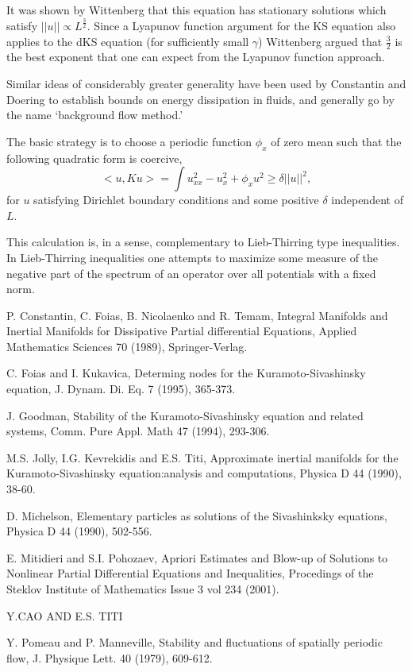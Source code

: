 It was shown by Wittenberg\cite{WITTENBERG} that this equation
has stationary solutions which satisfy $|\!|u|\!| \propto L^{\frac{3}{2}}.$
Since a Lyapunov function argument for the KS equation also applies
to the dKS equation (for sufficiently small $\gamma$) Wittenberg
argued that $\frac{3}{2}$ is the best exponent that one can expect
from the Lyapunov function approach.

Similar ideas of
considerably greater generality have been used by Constantin and Doering
to establish bounds on energy dissipation in fluids, and generally
go by the name `background flow method.'\cite{CD1,CD2}

The basic strategy is to choose a
periodic function $\phi_x$ of zero mean such that the following
quadratic form is coercive,
\[
<\!\!u, K u\!\!>= \int u_{xx}^2 - u_x^2 + \phi_x u^2 \ge \delta |\!|u|\!|^2,
\]
for $u$ satisfying Dirichlet boundary conditions and some positive
$\delta$ independent of $L$.

This calculation is, in a sense, complementary to Lieb-Thirring type
inequalities.
In Lieb-Thirring inequalities one attempts to maximize some measure of the
negative part of the spectrum of an operator over all potentials with
a fixed norm.



P. Constantin, C. Foias, B. Nicolaenko and R. Temam,
    Integral Manifolds and Inertial Manifolds for
    Dissipative Partial differential Equations,
    Applied Mathematics Sciences 70 (1989), Springer-Verlag.

C. Foias and I. Kukavica, Determing nodes for the Kuramoto-Sivashinsky equation, J. Dynam. Di. Eq. 7 (1995), 365-373.

J. Goodman, Stability of the Kuramoto-Sivashinsky equation and related systems, Comm. Pure Appl. Math 47 (1994), 293-306.

M.S. Jolly, I.G. Kevrekidis and E.S. Titi, Approximate inertial manifolds for the Kuramoto-Sivashinsky equation:analysis and computations, Physica D 44 (1990), 38-60.

D. Michelson, Elementary particles as solutions of the Sivashinksky equations, Physica D 44 (1990), 502-556.

E. Mitidieri and S.I. Pohozaev, Apriori Estimates and Blow-up of Solutions to Nonlinear Partial Differential Equations and Inequalities, Procedings of the Steklov Institute of Mathematics Issue 3 vol 234 (2001).

Y.CAO AND E.S. TITI

Y. Pomeau and P. Manneville, Stability and fluctuations of spatially periodic flow, J. Physique Lett. 40 (1979), 609-612.

